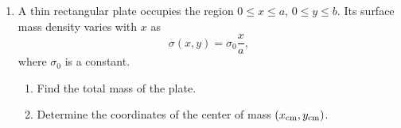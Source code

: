 \documentclass[12pt]{article}
\begin{document}
\begin{enumerate}
\item A thin rectangular plate occupies the region \(0 \le x \le a\), \(0 \le y \le b\). Its surface mass density varies with \(x\) as 
\[
\sigma(x, y) = \sigma_0 \frac{x}{a},
\] 
where \(\sigma_0\) is a constant.  

\begin{enumerate}
    \item[(a)] Find the total mass of the plate.
    \item[(b)] Determine the coordinates of the center of mass \((x_{\rm cm}, y_{\rm cm})\).
\end{enumerate}

\end{enumerate}
\end{document}
